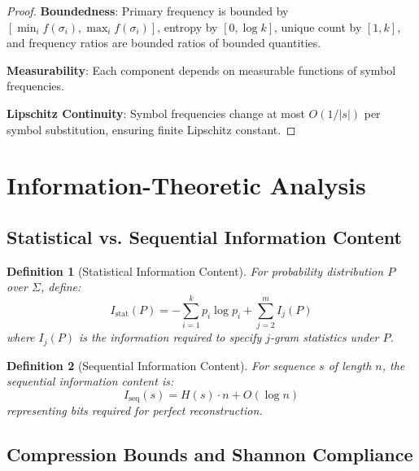 \documentclass[10pt,journal,compsoc]{IEEEtran}
\newtheorem{definition}{Definition}
\newcommand{\alphabet}{\Sigma}
\newcommand{\entropy}[1]{H(#1)}
\begin{document}
\begin{proof}
\textbf{Boundedness}: Primary frequency is bounded by $[\min_i f(\sigma_i), \max_i f(\sigma_i)]$, entropy by $[0, \log k]$, unique count by $[1, k]$, and frequency ratios are bounded ratios of bounded quantities.

\textbf{Measurability}: Each component depends on measurable functions of symbol frequencies.

\textbf{Lipschitz Continuity}: Symbol frequencies change at most $O(1/|s|)$ per symbol substitution, ensuring finite Lipschitz constant.
\end{proof}

\section{Information-Theoretic Analysis}

\subsection{Statistical vs. Sequential Information Content}

\begin{definition}[Statistical Information Content]
For probability distribution $P$ over $\alphabet$, define:
\[I_{\text{stat}}(P) = -\sum_{i=1}^k p_i \log p_i + \sum_{j=2}^m I_j(P)\]
where $I_j(P)$ is the information required to specify $j$-gram statistics under $P$.
\end{definition}

\begin{definition}[Sequential Information Content]
For sequence $s$ of length $n$, the sequential information content is:
\[I_{\text{seq}}(s) = \entropy{s} \cdot n + O(\log n)\]
representing bits required for perfect reconstruction.
\end{definition}

\subsection{Compression Bounds and Shannon Compliance}
\end{document}
